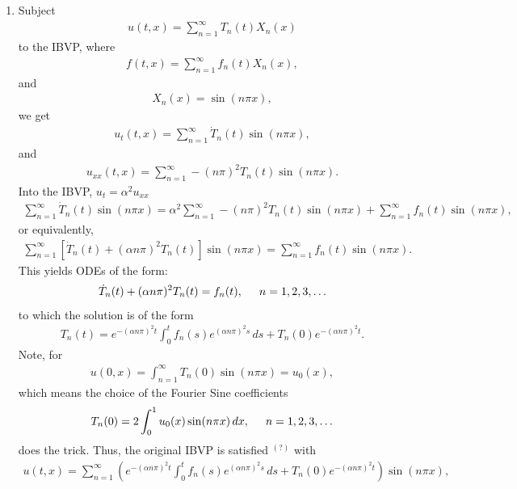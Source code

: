 \documentclass{article}
\theoremstyle{definition}
\begin{document}
\begin{enumerate}
	
	\item Subject
	\begin{align*}
	u(t,x) = \sum^\infty_{n=1}T_n(t)X_n(x)
	\end{align*}
	to the IBVP, where
	\begin{align*}
	f(t,x) = \sum_{n=1}^\infty f_n(t)X_n(x),
	\end{align*}
	and
	\begin{align*}
	X_n(x) = \sin(n\pi x),
	\end{align*}
	we get
	\begin{align*}
	u_t(t,x) = \sum^\infty_{n=1}\dot{T}_n(t)\sin(n\pi x),
	\end{align*}
	and
	\begin{align*}
	u_{xx}(t,x) = \sum^{\infty}_{n=1}-(n\pi)^2T_n(t)\sin(n\pi x).
	\end{align*}
	Into the IBVP, $u_t = \alpha^2 u_{xx}$
	\begin{align*}
	\sum^\infty_{n=1}\dot{T}_n(t)\sin(n\pi x) = \alpha^2 \sum^{\infty}_{n=1}-(n\pi)^2T_n(t)\sin(n\pi x) + \sum_{n=1}^\infty f_n(t)\sin(n\pi x),
	\end{align*}
	or equivalently,
	\begin{align*}
	\sum^\infty_{n=1}\left[\dot{T}_n(t) + (\alpha n\pi)^2T_n(t)\right]\sin(n\pi x) = \sum_{n=1}^\infty f_n(t)\sin(n\pi x).
	\end{align*}
	This yields ODEs of the form:
	\begin{align*}
	\dot{T}_n(t) + (\alpha n\pi)^2T_n(t) = f_n(t),\hspace{0.5cm}n=1,2,3,\dots
	\end{align*}
	to which the solution is of the form
	\begin{align*}
	T_n(t) = e^{-(\alpha n\pi)^2t}\int_0^t f_n(s) e^{(\alpha n \pi)^2s} \,ds + T_n(0)e^{-(\alpha n \pi)^2t}. 
	\end{align*}
	Note, for
	\begin{align*}
	u(0,x) = \int^\infty_{n=1} T_n(0)\sin(n\pi x) = u_0(x),
	\end{align*}
	which means the choice of the Fourier Sine coefficients
	\begin{align*}
	T_n(0) = 2\int^1_0 u_0(x)\sin(n\pi x)\,dx, \hspace{0.5cm}n=1,2,3,\dots
	\end{align*}
	does the trick. Thus, the original IBVP is satisfied $^{(?)}$ with
	\begin{align*}
	u(t,x) = \sum^\infty_{n=1} \left(e^{-(\alpha n\pi)^2t}\int_0^t f_n(s) e^{(\alpha n \pi)^2s} \,ds + T_n(0)e^{-(\alpha n \pi)^2t}\right)\sin(n\pi x),

\end{align*}
\end{enumerate}
\end{document}
